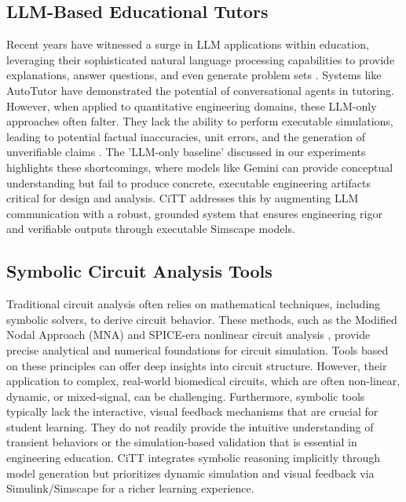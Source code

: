 \documentclass[10pt,twocolumn,letterpaper]{article}
\begin{document}
\subsection{LLM-Based Educational Tutors}
Recent years have witnessed a surge in LLM applications within education, leveraging their sophisticated natural language processing capabilities to provide explanations, answer questions, and even generate problem sets \cite{gemini_api_docs}. Systems like AutoTutor \cite{graesser_autotutor_2001} have demonstrated the potential of conversational agents in tutoring. However, when applied to quantitative engineering domains, these LLM-only approaches often falter. They lack the ability to perform executable simulations, leading to potential factual inaccuracies, unit errors, and the generation of unverifiable claims \cite{llm_math_reasoning_survey}. The 'LLM-only baseline' discussed in our experiments highlights these shortcomings, where models like Gemini can provide conceptual understanding but fail to produce concrete, executable engineering artifacts critical for design and analysis. CiTT addresses this by augmenting LLM communication with a robust, grounded system that ensures engineering rigor and verifiable outputs through executable Simscape models.

\subsection{Symbolic Circuit Analysis Tools}
Traditional circuit analysis often relies on mathematical techniques, including symbolic solvers, to derive circuit behavior. These methods, such as the Modified Nodal Approach (MNA) \cite{ho_mna_1975} and SPICE-era nonlinear circuit analysis \cite{nagel_rohrer_1971}, provide precise analytical and numerical foundations for circuit simulation. Tools based on these principles can offer deep insights into circuit structure. However, their application to complex, real-world biomedical circuits, which are often non-linear, dynamic, or mixed-signal, can be challenging. Furthermore, symbolic tools typically lack the interactive, visual feedback mechanisms that are crucial for student learning. They do not readily provide the intuitive understanding of transient behaviors or the simulation-based validation that is essential in engineering education. CiTT integrates symbolic reasoning implicitly through model generation but prioritizes dynamic simulation and visual feedback via Simulink/Simscape for a richer learning experience.
\end{document}
